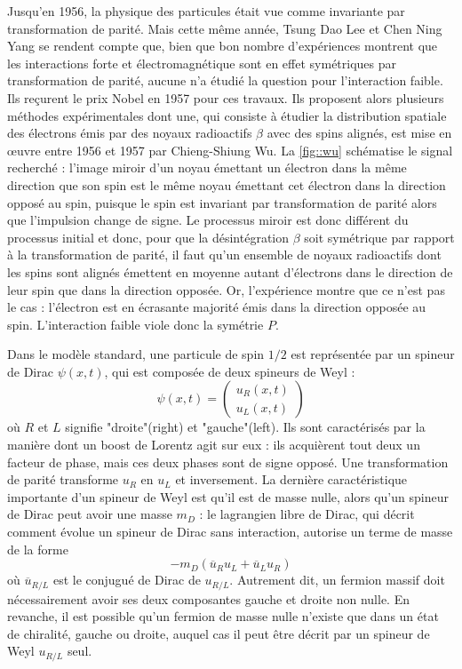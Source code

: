 			Jusqu'en 1956, la physique des particules était vue comme invariante par transformation de parité. Mais cette même année, Tsung Dao Lee et Chen Ning Yang\cite{Lee1956} se rendent compte que, bien que bon nombre d'expériences montrent que les interactions forte et électromagnétique sont en effet symétriques par transformation de parité, aucune n'a étudié la question pour l'interaction faible. Ils reçurent le prix Nobel en 1957 pour ces travaux. Ils proposent alors plusieurs méthodes expérimentales dont une, qui consiste à étudier la distribution spatiale des électrons émis par des noyaux radioactifs $\beta$ avec des spins alignés, est mise en œuvre entre 1956 et 1957 par Chieng-Shiung Wu. La \autoref{fig::wu} schématise le signal recherché : l'image miroir d'un noyau émettant un électron dans la même direction que son spin est le même noyau émettant cet électron dans la direction opposé au spin, puisque le spin est invariant par transformation de parité alors que l'impulsion change de signe. Le processus miroir est donc différent du processus initial et donc, pour que la désintégration $\beta$ soit symétrique par rapport à la transformation de parité, il faut qu'un ensemble de noyaux radioactifs dont les spins sont alignés émettent en moyenne autant d'électrons dans le direction de leur spin que dans la direction opposée. Or, l'expérience montre que ce n'est pas le cas : l'électron est en écrasante majorité émis dans la direction opposée au spin\cite{Wu1957}. L'interaction faible viole donc la symétrie $P$.
			
			Dans le modèle standard, une particule de spin $1/2$ est représentée par un spineur de Dirac $\psi(x,t)$, qui est composée de deux spineurs de Weyl :
			\begin{equation}
				\psi(x,t)=\left(\begin{matrix} u_R(x,t) \\ u_L(x,t)\end{matrix}\right)
			\end{equation}
			où $R$ et $L$ signifie "droite"(right) et "gauche"(left). Ils sont caractérisés par la manière dont un boost de Lorentz agit sur eux : ils acquièrent tout deux un facteur de phase, mais ces deux phases sont de signe opposé. Une transformation de parité transforme $u_R$ en $u_L$ et inversement. La dernière caractéristique importante d'un spineur de Weyl est qu'il est de masse nulle, alors qu'un spineur de Dirac peut avoir une masse $m_D$ : le lagrangien libre de Dirac, qui décrit comment évolue un spineur de Dirac sans interaction, autorise un terme de masse de la forme
			\begin{equation}\label{dirac_mass}
				-m_D(\overline{u}_R u_L + \overline{u}_L u_R)
			\end{equation}
			où $\overline{u}_{R/L}$ est le conjugué de Dirac de $u_{R/L}$. Autrement dit, un fermion massif doit nécessairement avoir ses deux composantes gauche et droite non nulle. En revanche, il est possible qu'un fermion de masse nulle n'existe que dans un état de chiralité, gauche ou droite, auquel cas il peut être décrit par un spineur de Weyl $u_{R/L}$ seul.
			
